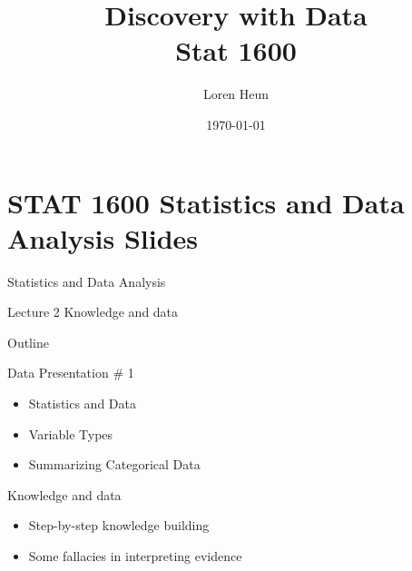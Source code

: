 \documentclass[14pt]{beamer}\usepackage[]{graphicx}\usepackage[]{color}
\title{Discovery with Data \\ Stat 1600}
\author{Loren Heun}
\institute{WMU}
\date{\today}
\begin{document}
\frame{\titlepage}







{\tiny{
\tableofcontents
}}



\section{STAT 1600 Statistics and Data Analysis Slides}

\begin{frame}[fragile]{Statistics and Data Analysis}

Lecture 2 Knowledge and data

\end{frame}

\begin{frame}[fragile]{Outline}

Data Presentation \# 1

\begin{itemize}
\item Statistics and Data
\item Variable Types
\item Summarizing Categorical Data
\end{itemize}
\end{frame}

\begin{frame}[fragile]{Knowledge and data}

\begin{itemize}
\item Step-by-step knowledge building
\item Some fallacies in interpreting evidence
\end{itemize}
\end{frame}
\end{document}
